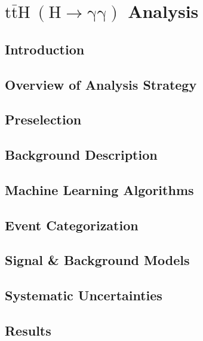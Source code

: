 \chapter{$\mathrm{t\bar{t}H~(H \to \gamma \gamma)}$ Analysis}

\section{Introduction} \label{sec:tth_intro}


\section{Overview of Analysis Strategy} \label{sec:tth_analysis_strategy}


\section{Preselection} \label{sec:tth_presel}


\section{Background Description} \label{sec:tth_background_description}


\section{Machine Learning Algorithms} \label{sec:tth_mvas}


\section{Event Categorization} \label{sec:tth_event_categorization}


\section{Signal \& Background Models} \label{sec:tth_sig_bkg_models}


\section{Systematic Uncertainties} \label{sec:tth_systematic_uncertainties}


\section{Results} \label{sec:tth_results}
